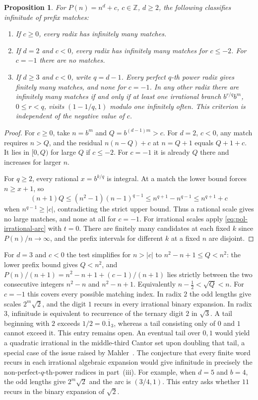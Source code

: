 \documentclass[11pt,reqno,a4paper]{amsart}
\newtheorem{proposition}[theorem]{Proposition}
\theoremstyle{remark}
\begin{document}
\begin{proposition}\label{prop:pol-power-prefix}
For \(P(n)=n^d+c\), \(c\in\mathbb Z\), \(d\ge2\), the following
classifies infinitude of prefix matches:
\begin{enumerate}
\item If \(c\ge0\), every radix has infinitely many matches.
\item If \(d=2\) and \(c<0\), every radix has infinitely many
matches for \(c\le-2\). For \(c=-1\) there are no matches.
\item If \(d\ge3\) and \(c<0\), write \(q=d-1\).
Every perfect \(q\)-th power radix gives finitely many matches,
and none for \(c=-1\). In any other radix there are infinitely
many matches if and only if at least one irrational branch
\(b^{r/q}b^m\), \(0\le r<q\), visits \((1-1/q,1)\) modulo one
infinitely often. This criterion is independent of the
negative value of \(c\).
\end{enumerate}
\end{proposition}
\begin{proof}
For \(c\ge0\), take \(n=b^m\) and \(Q=b^{(d-1)m}>c\).
For \(d=2\), \(c<0\), any match requires \(n>Q\), and the
residual \(n(n-Q)+c\) at \(n=Q+1\) equals \(Q+1+c\).
It lies in \([0,Q)\) for large \(Q\) if \(c\le-2\).
For \(c=-1\) it is already \(Q\) there and increases for
larger \(n\).

For \(q\ge2\), every rational \(x=b^{k/q}\) is integral.
At a match the lower bound forces \(n\ge x+1\), so
\[
 (n+1)Q\le(n^2-1)(n-1)^{q-1}
 \le n^{q+1}-n^{q-1}\le n^{q+1}+c
\]
when \(n^{q-1}\ge |c|\), contradicting the strict upper bound.
Thus a rational scale gives no large matches, and none at
all for \(c=-1\). For irrational scales apply
\eqref{eq:pol-irrational-arc} with \(t=0\).
There are finitely many candidates at each fixed \(k\) since
\(P(n)/n\to\infty\), and the prefix intervals for different
\(k\) at a fixed \(n\) are disjoint.
\end{proof}

For \(d=3\) and \(c<0\) the test simplifies for \(n>|c|\) to
\(n^2-n+1\le Q<n^2\): the lower prefix bound gives \(Q<n^2\),
and \(P(n)/(n+1)=n^2-n+1+(c-1)/(n+1)\) lies strictly between
the two consecutive integers \(n^2-n\) and \(n^2-n+1\).
Equivalently \(n-\tfrac12<\sqrt Q<n\). For \(c=-1\) this covers
every possible matching index. In radix \(2\) the odd lengths
give scales \(2^m\sqrt2\), and the digit \(1\) recurs in every
irrational binary expansion. In radix \(3\), infinitude is
equivalent to recurrence of the ternary digit \(2\) in
\(\sqrt3\). A tail beginning with \(2\) exceeds
\(1/2=0.\overline{1}_3\), whereas a tail consisting only of \(0\)
and \(1\) cannot exceed it. This entry remains open. An eventual
tail over \(0,1\) would yield a quadratic irrational in the
middle-third Cantor set upon doubling that tail, a special
case of the issue raised by Mahler~\cite[\S2]{pol-mahler}.
The conjecture that every finite word recurs in each irrational
algebraic expansion would give infinitude in precisely the
non-perfect-\(q\)-th-power radices in part~(iii).
For example, when \(d=5\) and \(b=4\), the odd lengths give
\(2^m\sqrt2\) and the arc is \((3/4,1)\). This entry asks
whether \(11\) recurs in the binary expansion of \(\sqrt2\).
\end{document}
